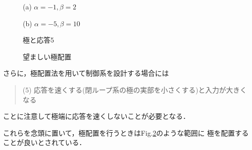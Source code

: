 \begin{figure}[t!]
 \begin{minipage}{0.5\textwidth}
  \begin{center}
   (a) $\alpha = -1, \beta = 2$
  \end{center}
 \end{minipage}%
 \begin{minipage}{0.5\textwidth}
  \begin{center}
   (b) $\alpha = -5, \beta = 10$
  \end{center}
 \end{minipage}
 \caption{極と応答5}
 \label{fig_pole910}
\end{figure}

\begin{figure}[h]
 \begin{center}
  \caption{望ましい極配置}
  \label{fig_pole}
 \end{center}
\end{figure}

さらに，極配置法を用いて制御系を設計する場合には
\begin{quote}
 (5) 応答を速くする(閉ループ系の極の実部を小さくする)と入力が大きくなる 
\end{quote}
ことに注意して極端に応答を速くしないことが必要となる．

これらを念頭に置いて，極配置を行うときはFig.\ref{fig_pole}のような範囲に
極を配置することが良いとされている．

\pagebreak

